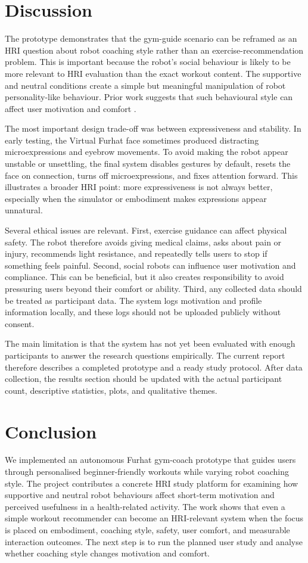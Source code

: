\documentclass[conference, onecolumn]{IEEEtran}
\begin{document}
\section{Discussion}
The prototype demonstrates that the gym-guide scenario can be reframed as an HRI question about robot coaching style rather than an exercise-recommendation problem. This is important because the robot's social behaviour is likely to be more relevant to HRI evaluation than the exact workout content. The supportive and neutral conditions create a simple but meaningful manipulation of robot personality-like behaviour. Prior work suggests that such behavioural style can affect user motivation and comfort \cite{andrist2015look,esterwood2021systematic}.

The most important design trade-off was between expressiveness and stability. In early testing, the Virtual Furhat face sometimes produced distracting microexpressions and eyebrow movements. To avoid making the robot appear unstable or unsettling, the final system disables gestures by default, resets the face on connection, turns off microexpressions, and fixes attention forward. This illustrates a broader HRI point: more expressiveness is not always better, especially when the simulator or embodiment makes expressions appear unnatural.

Several ethical issues are relevant. First, exercise guidance can affect physical safety. The robot therefore avoids giving medical claims, asks about pain or injury, recommends light resistance, and repeatedly tells users to stop if something feels painful. Second, social robots can influence user motivation and compliance. This can be beneficial, but it also creates responsibility to avoid pressuring users beyond their comfort or ability. Third, any collected data should be treated as participant data. The system logs motivation and profile information locally, and these logs should not be uploaded publicly without consent.

The main limitation is that the system has not yet been evaluated with enough participants to answer the research questions empirically. The current report therefore describes a completed prototype and a ready study protocol. After data collection, the results section should be updated with the actual participant count, descriptive statistics, plots, and qualitative themes.

\section{Conclusion}
We implemented an autonomous Furhat gym-coach prototype that guides users through personalised beginner-friendly workouts while varying robot coaching style. The project contributes a concrete HRI study platform for examining how supportive and neutral robot behaviours affect short-term motivation and perceived usefulness in a health-related activity. The work shows that even a simple workout recommender can become an HRI-relevant system when the focus is placed on embodiment, coaching style, safety, user comfort, and measurable interaction outcomes. The next step is to run the planned user study and analyse whether coaching style changes motivation and comfort.
\end{document}
